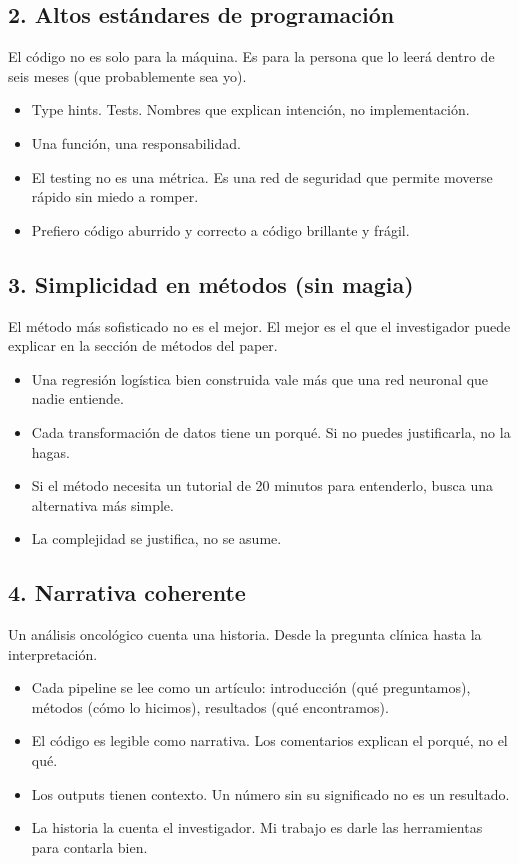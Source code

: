 \documentclass[11pt]{article}
\begin{document}
\subsection*{2. Altos estándares de programación}

El código no es solo para la máquina. Es para la persona que lo leerá dentro de seis meses (que probablemente sea yo).

\begin{itemize}[label=\textendash]
  \item Type hints. Tests. Nombres que explican intención, no implementación.
  \item Una función, una responsabilidad.
  \item El testing no es una métrica. Es una red de seguridad que permite moverse rápido sin miedo a romper.
  \item Prefiero código aburrido y correcto a código brillante y frágil.
\end{itemize}

\subsection*{3. Simplicidad en métodos (sin magia)}

El método más sofisticado no es el mejor. El mejor es el que el investigador puede explicar en la sección de métodos del paper.

\begin{itemize}[label=\textendash]
  \item Una regresión logística bien construida vale más que una red neuronal que nadie entiende.
  \item Cada transformación de datos tiene un porqué. Si no puedes justificarla, no la hagas.
  \item Si el método necesita un tutorial de 20 minutos para entenderlo, busca una alternativa más simple.
  \item La complejidad se justifica, no se asume.
\end{itemize}

\subsection*{4. Narrativa coherente}

Un análisis oncológico cuenta una historia. Desde la pregunta clínica hasta la interpretación.

\begin{itemize}[label=\textendash]
  \item Cada pipeline se lee como un artículo: introducción (qué preguntamos), métodos (cómo lo hicimos), resultados (qué encontramos).
  \item El código es legible como narrativa. Los comentarios explican el porqué, no el qué.
  \item Los outputs tienen contexto. Un número sin su significado no es un resultado.
  \item La historia la cuenta el investigador. Mi trabajo es darle las herramientas para contarla bien.
\end{itemize}
\end{document}

